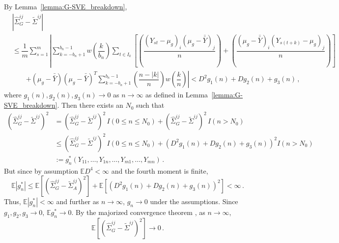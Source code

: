 \documentclass[11pt]{article}
\newcommand{\E}{\mathbb{E}}
\theoremstyle{remark}
\begin{document}
By Lemma~\ref{lemma:G-SVE_breakdown},
\begin{align*}
 &\left| \hat{\Sigma}_{G}^{ij} - \tilde{\Sigma}^{ij} \right|\\
 & \leq \dfrac{1}{m} \sum_{s=1}^m \left| \sum_{k=-b_n+1}^{b_n-1} w \left(\dfrac{k}{b_n} \right) \sum_{t \in I_k}   \left[ \left( \dfrac{(Y_{st} - \mu_g)_i(\mu_g-\bar{\bar{Y}})_j}{n}\right)+ \left(\dfrac{(\mu_g-\bar{\bar{Y}})_i(Y_{s(t+k)}-\mu_g)_j}{n}\right) \right] \right.\\
& \quad \quad  \left. + (\mu_g-\bar{\bar{Y}})(\mu_g-\bar{\bar{Y}})^T\sum_{k=-b_n+1}^{b_n-1}\left(\dfrac{n-|k|}{n}\right)w\left(\dfrac{k}{n}\right) \right|  < D^2g_1(n) + Dg_2(n) + g_3(n)\,,
\end{align*}
where $g_1(n), g_2(n), g_3(n) \to 0$ as $n \to \infty$ as defined in Lemma~\ref{lemma:G-SVE_breakdown}. Then there exists an $N_0$ such that
\begin{align*}
\left(\hat{\Sigma}_{G}^{ij} - \tilde{\Sigma}^{ij} \right)^2 &= \left(\hat{\Sigma}_{G}^{ij} - \tilde{\Sigma}^{ij} \right)^2 \, I(0 \leq n \leq N_0) + \left(\hat{\Sigma}_{G}^{ij} - \tilde{\Sigma}^{ij} \right)^2 \, I(n > N_0)\\
& \leq \left(\hat{\Sigma}_{G}^{ij} - \tilde{\Sigma}^{ij} \right)^2 \, I(0 \leq n \leq N_0) +  \left(D^2g_1(n) + Dg_2(n) + g_3(n) \right)^2 I(n > N_0)\\
& := g_n^*(Y_{11}, \dots, Y_{1n}, \dots, Y_{m1}, \dots, Y_{mn})\,.
\end{align*}
But since by assumption $\E D^4 <\infty$ and the fourth moment is finite,
\[
\E \left| g_n^* \right| \leq  \E \left[\left(\hat{\Sigma}_{G}^{ij} - \tilde{\Sigma}_{A}^{ij} \right)^2 \right] + \E \left[\left(D^2g_1(n) + Dg_2(n) + g_3(n) \right)^2 \right] < \infty\,.
\]
Thus, $\E \left| g_n^* \right| < \infty$ and further as $n \to \infty$, $g_n \to 0$ under the assumptions. Since $g_1, g_2, g_3 \to 0$, $\E g_n^* \to 0$. By the majorized convergence theorem \citep{zeid:2013}, as $n \to \infty$,
\begin{equation}
\label{eq:squared_mean_diff}
  \E \left[\left(\hat{\Sigma}_{G}^{ij} - \tilde{\Sigma}^{ij} \right)^2 \right] \to 0\,.
\end{equation}
\end{document}
